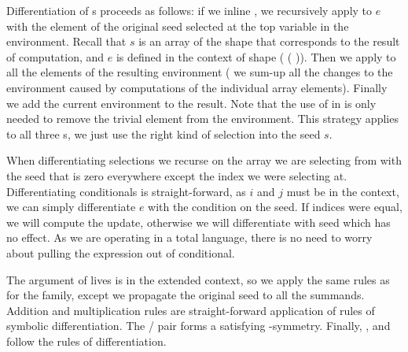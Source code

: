 Differentiation of s proceeds as follows: if we inline , we
recursively apply  to $e$ 
with the element of the original seed  selected at the top variable in
the  environment.  Recall that $s$ is an array of the shape that
corresponds to the result of  computation, and $e$ is defined in
the context of shape (  ( )).  Then we apply 
to all the elements of the resulting environment (\ie{} we sum-up all the
changes to the environment caused by computations of the individual array
elements).  Finally we add the current environment  to the result.
Note that the use of  in  is only needed to remove the
trivial  element from the environment.  This strategy applies to all
three s, we just use the right kind of selection into the seed $s$.

When differentiating selections we recurse on the array we are
selecting from with the seed that is zero everywhere except the index we were
selecting at.  Differentiating
conditionals is straight-forward, as $i$ and $j$ must be in the context, we can
simply differentiate $e$ with the condition on the seed.  If indices were equal, we will
compute the update, otherwise we will differentiate with seed  which
has no effect.  As we are operating in a total language, there is no need to worry
about pulling the expression out of conditional.

The argument of 
lives is in the extended context, so we apply the same rules as for the  family,
except we propagate the original seed to all the summands.  Addition and multiplication
rules are straight-forward application of rules of symbolic differentiation.
The /
pair forms a satisfying -symmetry.  Finally, ,  and
 follow the rules of differentiation.

